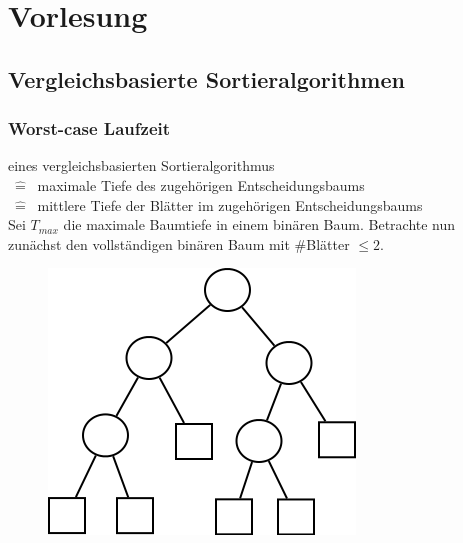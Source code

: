 \newcommand{\hl}[1]{\colorbox{yellow}{#1}}

\chapter{Vorlesung}
\section{Vergleichsbasierte Sortieralgorithmen}

\subsection{Worst-case Laufzeit}

eines vergleichsbasierten Sortieralgorithmus \\$~\hat{=}~$ maximale Tiefe des zugehörigen Entscheidungsbaums \\$~\hat{=}~$ mittlere Tiefe der Blätter im zugehörigen Entscheidungsbaums\\

Sei $T_{max}$ die maximale Baumtiefe in einem binären Baum. 
Betrachte nun zunächst den vollständigen binären Baum mit \#Blätter $\leq 2$. \\


\begin{figure}
\vspace{-50pt}
\includegraphics[width=\linewidth]{9/Grafik/img1.png}
\caption{}
\end{figure}


